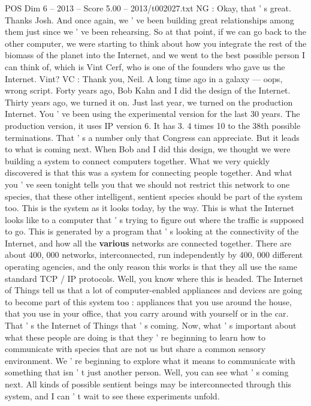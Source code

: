 \begin{textsample}{POS Dim 6 – 2013 – Score 5.00 – 2013/t002027.txt}
NG : Okay, that ' s great.
Thanks Josh.
And once again, we ' ve been building great relationships among them just since we ' ve been rehearsing.
So at that point, if we can go back to the other computer, we were starting to think about how you integrate the rest of the biomass of the planet into the Internet, and we went to the best possible person I can think of, which is Vint Cerf, who is one of the founders who gave us the Internet.
Vint?
VC : Thank you, Neil.
A long time ago in a galaxy — oops, wrong script.
Forty years ago, Bob Kahn and I did the design of the Internet.
Thirty years ago, we turned it on.
Just last year, we turned on the production Internet.
You ' ve been using the experimental version for the last 30 years.
The production version, it uses IP version 6.
It has 3. 4 times 10 to the 38th possible terminations.
That ' s a number only that Congress can appreciate.
But it leads to what is coming next.
When Bob and I did this design, we thought we were building a system to connect computers together.
What we very quickly discovered is that this was a system for connecting people together.
And what you ' ve seen tonight tells you that we should not restrict this network to one species, that these other intelligent, sentient species should be part of the system too.
This is the system as it looks today, by the way.
This is what the Internet looks like to a computer that ' s trying to figure out where the traffic is supposed to go.
This is generated by a program that ' s looking at the connectivity of the Internet, and how all the \textbf{various} networks are connected together.
There are about 400, 000 networks, interconnected, run independently by 400, 000 different operating agencies, and the only reason this works is that they all use the same standard TCP / IP protocols.
Well, you know where this is headed.
The Internet of Things tell us that a lot of computer-enabled appliances and devices are going to become part of this system too : appliances that you use around the house, that you use in your office, that you carry around with yourself or in the car.
That ' s the Internet of Things that ' s coming.
Now, what ' s important about what these people are doing is that they ' re beginning to learn how to communicate with species that are not us but share a common sensory environment.
We ' re beginning to explore what it means to communicate with something that isn ' t just another person.
Well, you can see what ' s coming next.
All kinds of possible sentient beings may be interconnected through this system, and I can ' t wait to see these experiments unfold.

\end{textsample}
